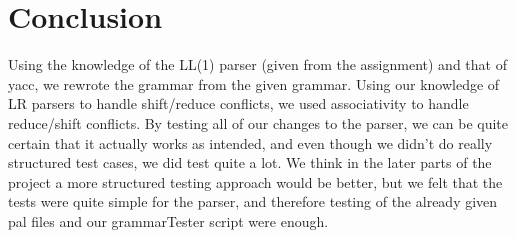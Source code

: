\section{Conclusion}
Using the knowledge of the LL(1) parser (given from the assignment) and that of
yacc, we rewrote the grammar from the given grammar. Using our knowledge of LR
parsers to handle shift/reduce conflicts, we used associativity to handle
reduce/shift conflicts. By testing all of our changes to the parser, we can be
quite certain that it actually works as intended, and even though we didn't do
really structured test cases, we did test quite a lot. We think in the later
parts of the project a more structured testing approach would be better, but we
felt that the tests were quite simple for the parser, and therefore testing of
the already given pal files and our grammarTester script were enough.
